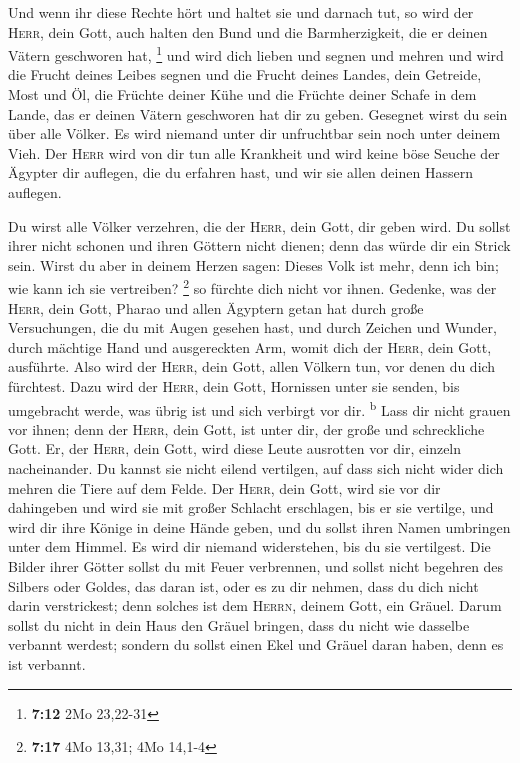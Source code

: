  Und wenn ihr diese Rechte hört und haltet sie und
darnach tut, so wird der \textsc{Herr}, dein Gott, auch halten den Bund
und die Barmherzigkeit, die er deinen Vätern geschworen hat, \footnote{\textbf{7:12}
  2Mo 23,22-31}  und wird dich lieben und segnen und
mehren und wird die Frucht deines Leibes segnen und die Frucht deines
Landes, dein Getreide, Most und Öl, die Früchte deiner Kühe und die
Früchte deiner Schafe in dem Lande, das er deinen Vätern geschworen hat
dir zu geben.  Gesegnet wirst du sein über alle Völker.
Es wird niemand unter dir unfruchtbar sein noch unter deinem Vieh.
 Der \textsc{Herr} wird von dir tun alle Krankheit und
wird keine böse Seuche der Ägypter dir auflegen, die du erfahren hast,
und wir sie allen deinen Hassern auflegen.

 Du wirst alle Völker verzehren, die der \textsc{Herr},
dein Gott, dir geben wird. Du sollst ihrer nicht schonen und ihren
Göttern nicht dienen; denn das würde dir ein Strick sein.
 Wirst du aber in deinem Herzen sagen: Dieses Volk ist
mehr, denn ich bin; wie kann ich sie vertreiben? \footnote{\textbf{7:17}
  4Mo 13,31; 4Mo 14,1-4}  so fürchte dich nicht vor
ihnen. Gedenke, was der \textsc{Herr}, dein Gott, Pharao und allen
Ägyptern getan hat  durch große Versuchungen, die du mit
Augen gesehen hast, und durch Zeichen und Wunder, durch mächtige Hand
und ausgereckten Arm, womit dich der \textsc{Herr}, dein Gott,
ausführte. Also wird der \textsc{Herr}, dein Gott, allen Völkern tun,
vor denen du dich fürchtest.  Dazu wird der
\textsc{Herr}, dein Gott, Hornissen unter sie senden, bis umgebracht
werde, was übrig ist und sich verbirgt vor dir. \textsuperscript{b}
 Lass dir nicht grauen vor ihnen; denn der \textsc{Herr},
dein Gott, ist unter dir, der große und schreckliche Gott.
 Er, der \textsc{Herr}, dein Gott, wird diese Leute
ausrotten vor dir, einzeln nacheinander. Du kannst sie nicht eilend
vertilgen, auf dass sich nicht wider dich mehren die Tiere auf dem
Felde.  Der \textsc{Herr}, dein Gott, wird sie vor dir
dahingeben und wird sie mit großer Schlacht erschlagen, bis er sie
vertilge,  und wird dir ihre Könige in deine Hände geben,
und du sollst ihren Namen umbringen unter dem Himmel. Es wird dir
niemand widerstehen, bis du sie vertilgest.  Die Bilder
ihrer Götter sollst du mit Feuer verbrennen, und sollst nicht begehren
des Silbers oder Goldes, das daran ist, oder es zu dir nehmen, dass du
dich nicht darin verstrickest; denn solches ist dem \textsc{Herrn},
deinem Gott, ein Gräuel.  Darum sollst du nicht in dein
Haus den Gräuel bringen, dass du nicht wie dasselbe verbannt werdest;
sondern du sollst einen Ekel und Gräuel daran haben, denn es ist
verbannt.

